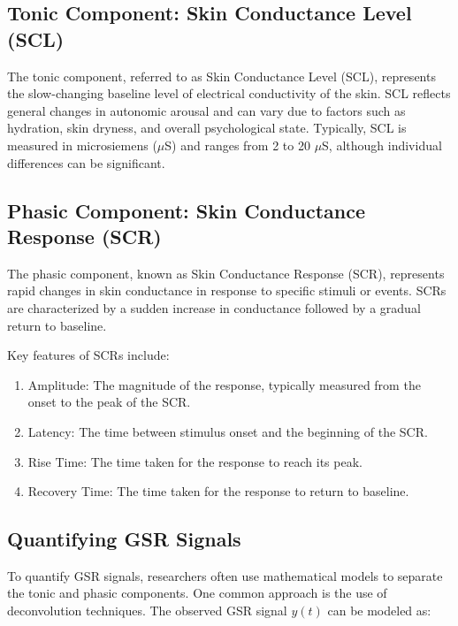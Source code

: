 \documentclass[twocolumn]{article}
\begin{document}
\subsection{Tonic Component: Skin Conductance Level (SCL)}
The tonic component, referred to as Skin Conductance Level (SCL), represents the slow-changing baseline level of electrical conductivity of the skin. SCL reflects general changes in autonomic arousal and can vary due to factors such as hydration, skin dryness, and overall psychological state. Typically, SCL is measured in microsiemens ($\mu$S) and ranges from 2 to 20 $\mu$S, although individual differences can be significant.\cite{Hernando-Gallego_Luengo_Artés-Rodríguez_2018}

\subsection{Phasic Component: Skin Conductance Response (SCR)}
The phasic component, known as Skin Conductance Response (SCR), represents rapid changes in skin conductance in response to specific stimuli or events. SCRs are characterized by a sudden increase in conductance followed by a gradual return to baseline.\cite{Hernando-Gallego_Luengo_Artés-Rodríguez_2018}

Key features of SCRs include:

\begin{enumerate}
    \item Amplitude: The magnitude of the response, typically measured from the onset to the peak of the SCR.\cite{Hernando-Gallego_Luengo_Artés-Rodríguez_2018}
    \item Latency: The time between stimulus onset and the beginning of the SCR.\cite{Hernando-Gallego_Luengo_Artés-Rodríguez_2018}
    \item Rise Time: The time taken for the response to reach its peak.\cite{Hernando-Gallego_Luengo_Artés-Rodríguez_2018}
    \item Recovery Time: The time taken for the response to return to baseline.\cite{Hernando-Gallego_Luengo_Artés-Rodríguez_2018}
\end{enumerate}

\subsection{Quantifying GSR Signals}
To quantify GSR signals, researchers often use mathematical models to separate the tonic and phasic components. One common approach is the use of deconvolution techniques. The observed GSR signal $y(t)$ can be modeled as:
\end{document}
